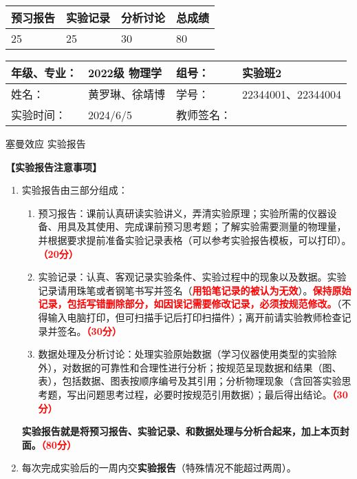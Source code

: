 \documentclass[dvipsnames, svgnames,a4paper,11pt]{article}
\begin{document}
	
	\begin{table}
		\renewcommand\arraystretch{1.7}
		\begin{tabularx}{\textwidth}{
				|X|X|X|X
				|X|X|X|X|}
			\hline
			\multicolumn{2}{|c|}{预习报告}&\multicolumn{2}{|c|}{实验记录}&\multicolumn{2}{|c|}{分析讨论}&\multicolumn{2}{|c|}{总成绩}\\
			\hline
			\LARGE25 & & \LARGE25 & & \LARGE30 & & \LARGE80 & \\
			\hline
		\end{tabularx}
	\end{table}
	
	\begin{table}
		\renewcommand\arraystretch{1.7}
		\begin{tabularx}{\textwidth}{|X|X|X|X|}
			\hline
			年级、专业： & 2022级 物理学 &组号： & 实验班2\\
			\hline
			姓名： & 黄罗琳、徐靖博   & 学号： &   22344001、22344004\\
			\hline
			实验时间： & 2024/6/5 & 教师签名： & \\
			\hline
		\end{tabularx}
	\end{table}
	
	\begin{center}
		\LARGE 塞曼效应 \quad 实验报告
	\end{center}
	
	
	\textbf{【实验报告注意事项】}
	\begin{enumerate}
		\item 实验报告由三部分组成：
		\begin{enumerate}
			\item 预习报告：课前认真研读实验讲义，弄清实验原理；实验所需的仪器设备、用具及其使用、完成课前预习思考题；了解实验需要测量的物理量，并根据要求提前准备实验记录表格（可以参考实验报告模板，可以打印）。\textcolor{red}{\textbf{（20分）}}
			\item 实验记录：认真、客观记录实验条件、实验过程中的现象以及数据。实验记录请用珠笔或者钢笔书写并签名（\textcolor{red}{\textbf{用铅笔记录的被认为无效}}）。\textcolor{red}{\textbf{保持原始记录，包括写错删除部分，如因误记需要修改记录，必须按规范修改。}}（不得输入电脑打印，但可扫描手记后打印扫描件）；离开前请实验教师检查记录并签名。\textcolor{red}{\textbf{（30分）}}
			\item 数据处理及分析讨论：处理实验原始数据（学习仪器使用类型的实验除外），对数据的可靠性和合理性进行分析；按规范呈现数据和结果（图、表），包括数据、图表按顺序编号及其引用；分析物理现象（含回答实验思考题，写出问题思考过程，必要时按规范引用数据）；最后得出结论。\textcolor{red}{\textbf{（30分）}}
		\end{enumerate}
		\textbf{实验报告就是将预习报告、实验记录、和数据处理与分析合起来，加上本页封面。\textcolor{red}{（80分）}}
		\item 每次完成实验后的一周内交\textbf{实验报告}（特殊情况不能超过两周）。
		
		
	\end{enumerate}
	
\end{document}
